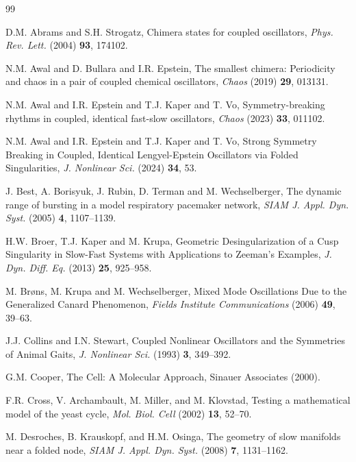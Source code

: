 \documentclass[10pt,onecolumn]{article}
\theoremstyle{plain}
\begin{document}
\begin{thebibliography}{99}
\setlength{\parskip}{0pt}
\small

D.M. Abrams and S.H. Strogatz,
Chimera states for coupled oscillators,
{\it Phys. Rev. Lett.} (2004) {\bf 93}, 174102.

N.M. Awal and D. Bullara and I.R. Epstein,
The smallest chimera: Periodicity and chaos in a pair of coupled chemical oscillators,
{\it Chaos} (2019) {\bf 29}, 013131.

N.M. Awal and I.R. Epstein and T.J. Kaper and T. Vo,
Symmetry-breaking rhythms in coupled, identical fast-slow oscillators,
{\it Chaos} (2023) {\bf 33}, 011102.

N.M. Awal and I.R. Epstein and T.J. Kaper and T. Vo,
Strong Symmetry Breaking in Coupled, Identical Lengyel-Epstein Oscillators via Folded Singularities,
{\it J. Nonlinear Sci.} (2024) {\bf 34}, 53.

J. Best, A. Borisyuk, J. Rubin, D. Terman and M. Wechselberger,
The dynamic range of bursting in a model respiratory pacemaker network,
{\it SIAM J. Appl. Dyn. Syst.} (2005) {\bf 4}, 1107--1139.

H.W. Broer, T.J. Kaper and M. Krupa,
Geometric Desingularization of a Cusp Singularity in Slow-Fast Systems with Applications to Zeeman's Examples,
{\it J. Dyn. Diff. Eq.} (2013) {\bf 25}, 925--958.

M. Br{\o}ns, M. Krupa and M. Wechselberger,
Mixed Mode Oscillations Due to the Generalized Canard Phenomenon,
{\it Fields Institute Communications} (2006) {\bf 49}, 39--63.

J.J. Collins and I.N. Stewart,
Coupled Nonlinear Oscillators and the Symmetries of Animal Gaits,
{\it J. Nonlinear Sci.} (1993) {\bf 3}, 349--392.

G.M. Cooper,
The Cell: A Molecular Approach,
Sinauer Associates (2000). 

F.R. Cross, V. Archambault, M. Miller, and M. Klovstad,
Testing a mathematical model of the yeast cycle,
{\it Mol. Biol. Cell} (2002) {\bf 13}, 52--70.

M. Desroches, B. Krauskopf, and H.M. Osinga,
The geometry of slow manifolds near a folded node,
{\it SIAM J. Appl. Dyn. Syst.} (2008) {\bf 7}, 1131--1162.


\end{thebibliography}
\end{document}
